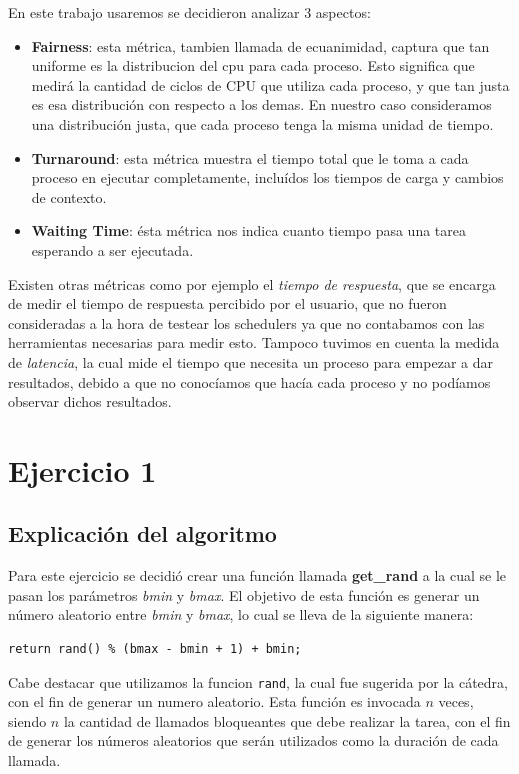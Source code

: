 \documentclass[a4paper]{article}
\begin{document}
En este trabajo usaremos se decidieron analizar 3 aspectos:

\begin{itemize}
  \item \textbf{Fairness}: esta métrica, tambien llamada de ecuanimidad,
  captura que tan uniforme es la distribucion del cpu para cada proceso.
  Esto significa que medirá la cantidad de ciclos de CPU que utiliza cada
  proceso, y que tan justa es esa distribución con respecto a los demas. En
  nuestro caso consideramos una distribución justa, que cada proceso tenga
  la misma
  unidad de tiempo.
  \item \textbf{Turnaround}: esta métrica muestra el tiempo total que le
  toma a cada proceso en ejecutar completamente, incluídos los tiempos de
  carga y cambios de contexto.
  \item \textbf{Waiting Time}: ésta métrica nos indica cuanto tiempo pasa
  una tarea esperando a ser ejecutada.
\end{itemize}

Existen otras métricas como por ejemplo el \textit{tiempo de respuesta}, que
se encarga de medir el tiempo de respuesta percibido por el usuario,
que no fueron consideradas a la hora de testear los schedulers ya que
no contabamos con las herramientas necesarias para medir esto. Tampoco
tuvimos en cuenta la medida de \textit{latencia}, la cual mide el tiempo que
necesita un proceso para empezar a dar resultados, debido a que no
conocíamos que hacía cada proceso y no podíamos observar dichos resultados.
\newpage


\section{Ejercicio 1}

\subsection{Explicación del algoritmo}
Para este ejercicio se decidió crear una función llamada \textbf{get\_rand}
a la cual se le pasan los parámetros \textit{bmin} y \textit{bmax}. El
objetivo de esta función es generar un número aleatorio entre \textit{bmin}
y \textit{bmax}, lo cual se lleva de la siguiente manera:

\begin{verbatim}
return rand() % (bmax - bmin + 1) + bmin;
\end{verbatim}

Cabe destacar que utilizamos la funcion \verb|rand|, la cual fue sugerida
por la cátedra, con el fin de generar un numero aleatorio. Esta función es
invocada $n$ veces, siendo $n$ la cantidad de llamados bloqueantes que debe
realizar la tarea, con el fin de generar los números aleatorios que serán
utilizados como la duración de cada llamada.
\end{document}
